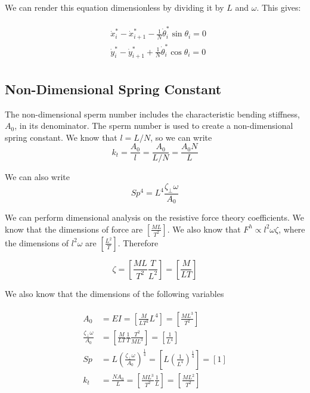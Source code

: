 \documentclass[12pt,letterpaper,titlepage]{article}
\begin{document}
We can render this equation dimensionless by dividing it by $L$ and $\omega$. This gives:

\begin{align}
\begin{split}
& \dot{x}_i^* - \dot{x}_{i+1}^* - \frac{1}{N} \dot{\theta}_i^* \sin \theta_i = 0 \\
& \dot{y}_i^* - \dot{y}_{i+1}^* + \frac{1}{N} \dot{\theta}_i^* \cos \theta_i = 0
\end{split}
\end{align}

\subsection{Non-Dimensional Spring Constant}
The non-dimensional sperm number includes the characteristic bending stiffness, $A_0$, in its denominator. The sperm number is used to create a non-dimensional spring constant. We know that $l = L/N$, so we can write
\begin{equation}
k_t = \frac{A_0}{l} = \frac{A_0}{L/N} = \frac{A_0 N}{L}
\end{equation}

We can also write
\begin{equation}
Sp^4 = L^4 \frac{\zeta_{\bot} \omega}{A_0}
\end{equation}

We can perform dimensional analysis on the resistive force theory coefficients. We know that the dimensions of force are $[\frac{ML}{T^2}]$. We also know that $F^h \propto l^2 \omega \zeta$, where the dimensions of $l^2 \omega$ are $[\frac{L^2}{T}]$. Therefore

\begin{equation}
\zeta = [\frac{ML}{T^2} \frac{T}{L^2} ] = [\frac{M}{LT}]
\end{equation}

We also know that the dimensions of the following variables

\begin{align}
\begin{split}
A_0 &= EI = [\frac{M}{LT^2} L^4] = [\frac{ML^3}{T^2}] \\
\frac{\zeta_{\bot} \omega}{A_0} &= [\frac{M}{LT} \frac{1}{T} \frac{T^2}{ML^3}] = [\frac{1}{L^4}] \\
Sp &= L (\frac{\zeta_{\bot} \omega}{A_0})^{\frac{1}{4}} = [L (\frac{1}{L^4})^{\frac{1}{4}}] = [1] \\
k_t &= \frac{NA_0}{L} = [\frac{ML^3}{T^2} \frac{1}{L}] = [\frac{ML^2}{T^2}]
\end{split}
\end{align}
\end{document}

